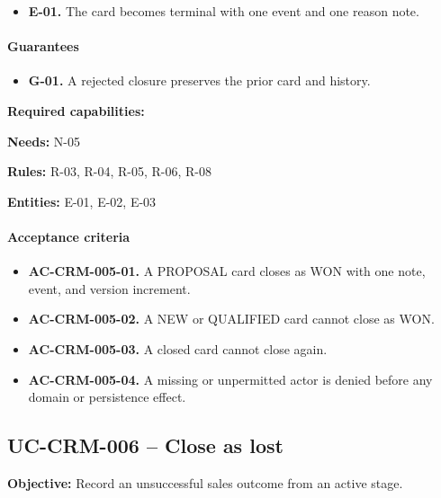 \documentclass[10pt,a4paper]{article}
\begin{document}
\begin{itemize}

\item \textbf{E-01.} The card becomes terminal with one event and one reason note.

\end{itemize}

\paragraph{Guarantees}

\begin{itemize}

\item \textbf{G-01.} A rejected closure preserves the prior card and history.

\end{itemize}

\textbf{Required capabilities:} 

\textbf{Needs:} N-05

\textbf{Rules:} R-03, R-04, R-05, R-06, R-08

\textbf{Entities:} E-01, E-02, E-03

\paragraph{Acceptance criteria}

\begin{itemize}

\item \textbf{AC-CRM-005-01.} A PROPOSAL card closes as WON with one note, event, and version increment.

\item \textbf{AC-CRM-005-02.} A NEW or QUALIFIED card cannot close as WON.

\item \textbf{AC-CRM-005-03.} A closed card cannot close again.

\item \textbf{AC-CRM-005-04.} A missing or unpermitted actor is denied before any domain or persistence effect.

\end{itemize}

\subsection{UC-CRM-006 -- Close as lost}

\textbf{Objective:} Record an unsuccessful sales outcome from an active stage.
\end{document}
